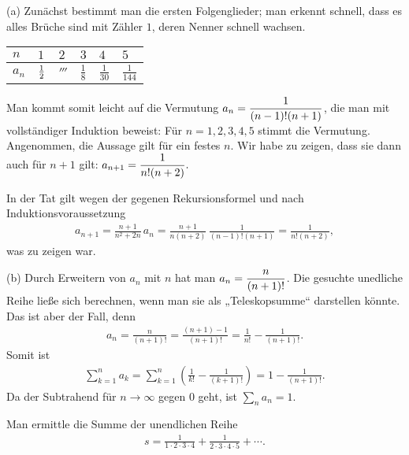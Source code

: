 \documentclass[11pt,a4paper]{article}
\begin{document}
\begin{loesung}
(a) Zunächst bestimmt man die ersten Folgenglieder; man erkennt schnell, dass
  es alles Brüche sind mit Zähler $1$, deren Nenner schnell wachsen.
\begin{center}
\begin{tabular}{l||lllll}
$n$ & $1$ & $2$ & $3$ & $4 $ & $5$\\  \hline
$a_n$ & $\frac{1}{2} $ & $\third $ & $\frac{1}{8} $ & $\frac{1}{30} $ & 
$\frac{1}{144}$ 
\end{tabular}
\end{center}

Man kommt somit leicht auf die Vermutung $\displaystyle a_n=\frac{1}{(n-1)! (n+1)}$, die
man mit vollständiger Induktion beweist: Für $n=1,2,3,4,5$ stimmt die
Vermutung. Angenommen, die Aussage gilt für ein festes $n$. Wir habe zu zeigen,
dass sie dann auch für $n+1$ gilt: $\displaystyle a_{n+1}= \frac{1}{n! (n+2)}.$

In der Tat gilt wegen der gegenen Rekursionsformel und nach
Induktionsvoraussetzung
\begin{gather*}
a_{n+1}= \frac{n+1}{n^2 +2n} \,a_{n} = \frac{n+1}{n(n+2)} \, \frac{1}{(n-1)!
  (n+1)}=\frac{1}{n! (n+2)},
\end{gather*}
was zu zeigen war.

(b) Durch Erweitern von $a_n $ mit $n$ hat man $\displaystyle a_n=\frac{n}{(n+1)!}$. Die
gesuchte unedliche Reihe ließe sich berechnen, wenn man sie als „Teleskopsumme“
darstellen könnte. Das ist aber der Fall, denn
\begin{gather*}
a_n=\frac{n}{(n+1)!} = \frac{(n+1) -1 }{(n+1)!} =\frac{1}{n!}
-\frac{1}{(n+1)!}.
\end{gather*} 
Somit ist
\begin{gather*}
\sum_{k=1}^n a_k=\sum_{k=1}^n\left(\frac{1}{k!} -\frac{1}{(k+1)!}\right)
=1-\frac{1}{(n+1)!}.
\end{gather*}
Da der Subtrahend für $n\to \infty $ gegen $0$ geht, ist $\sum_n a_n=1$.
\end{loesung}

\begin{aufgabe}Man ermittle die Summe der unendlichen Reihe
\begin{gather*}
s=\frac{1}{1\cdot 2\cdot 3\cdot 4} +\frac{1}{2\cdot 3\cdot 4\cdot 5} +\cdots.
\end{gather*}
\end{aufgabe}
\end{document}
